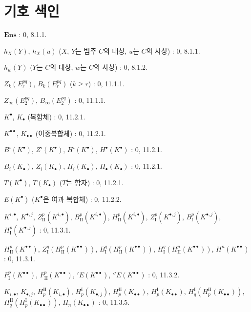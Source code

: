 \clearpage
{}
\section*{기호 색인}

\begin{flushleft}
$\mathbf{Ens}$ : 0, 8.1.1.

$h_X(Y)$, $h_X(u)$ ($X$, $Y$는 범주 $C$의 대상, $u$는 $C$의
사상) : 0, 8.1.1.

$h_w(Y)$ ($Y$는 $C$의 대상, $w$는 $C$의 사상) : 0, 8.1.2.

$Z_k(E_r^{pq})$, $B_k(E_r^{pq})$ ($k\geq r$) : 0, 11.1.1.

$Z_\infty(E_2^{pq})$, $B_\infty(E_2^{pq})$ : 0, 11.1.1.

$K^\bullet$, $K_\bullet$ (복합체) : 0, 11.2.1.

$K^{\bullet\bullet}$, $K_{\bullet\bullet}$ (이중복합체) : 0, 11.2.1.

$B^i(K^\bullet)$, $Z^i(K^\bullet)$, $H^i(K^\bullet)$,
$H^\bullet(K^\bullet)$ : 0, 11.2.1.

$B_i(K_\bullet)$, $Z_i(K_\bullet)$, $H_i(K_\bullet)$,
$H_\bullet(K_\bullet)$ : 0, 11.2.1.

$T(K^\bullet)$, $T(K_\bullet)$ ($T$는 함자) : 0, 11.2.1.

$E(K^\bullet)$ ($K^\bullet$은 여과 복합체) : 0, 11.2.2.

$K^{i,\bullet}$, $K^{\bullet,j}$, $Z_{\mathrm{II}}^p(K^{i,\bullet})$,
$B_{\mathrm{II}}^p(K^{i,\bullet})$, $H_{\mathrm{II}}^p(K^{i,\bullet})$,
$Z_{\mathrm I}^p(K^{\bullet,j})$, $B_{\mathrm I}^p(K^{\bullet,j})$,
$H_{\mathrm I}^p(K^{\bullet,j})$ : 0, 11.3.1.

$H_{\mathrm{II}}^p(K^{\bullet\bullet})$,
$Z_{\mathrm I}^q(H_{\mathrm{II}}^p(K^{\bullet\bullet}))$,
$B_{\mathrm I}^q(H_{\mathrm{II}}^p(K^{\bullet\bullet}))$,
$H_{\mathrm I}^q(H_{\mathrm{II}}^p(K^{\bullet\bullet}))$,
$H^n(K^{\bullet\bullet})$ : 0, 11.3.1.

$F_{\mathrm I}^p(K^{\bullet\bullet})$,
$F_{\mathrm{II}}^p(K^{\bullet\bullet})$, ${}'E(K^{\bullet\bullet})$,
${}''E(K^{\bullet\bullet})$ : 0, 11.3.2.

$K_{i,\bullet}$, $K_{\bullet,j}$, $H_p^{\mathrm{II}}(K_{i,\bullet})$,
$H_p^{\mathrm I}(K_{\bullet,j})$, $H_p^{\mathrm{II}}(K_{\bullet\bullet})$,
$H_p^{\mathrm I}(K_{\bullet\bullet})$,
$H_q^{\mathrm I}(H_p^{\mathrm{II}}(K_{\bullet\bullet}))$,
$H_q^{\mathrm{II}}(H_p^{\mathrm I}(K_{\bullet\bullet}))$,
$H_n(K_{\bullet\bullet})$ : 0, 11.3.5.


\end{flushleft}
